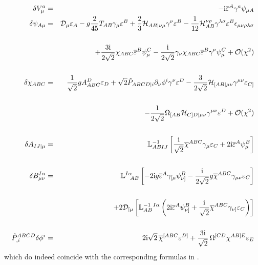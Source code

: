 \documentclass[a4paper,12pt]{article}
\def\bar{\overline}\end {picture}}
\begin{document}
\begin{eqnarray}
\delta V^a_{\mu} &=& - {\rm i} \bar{\varepsilon}^A \gamma^a\psi_{\mu A}  \\
\delta \psi_{A \mu}  &=&{\mathcal{D}}_\mu \varepsilon_A - g
{2\over 45}T_{AB}\gamma_\mu \varepsilon^{B} +  {2\over 3}
\mathcal{H}_{AB|\nu\mu} \gamma^{\nu} \varepsilon^B -{1\over
12}\mathcal{H}_{AB}^{\nu\rho} \gamma^{\lambda\sigma}
\varepsilon^B \epsilon _{\mu\nu\rho\lambda\sigma} \nonumber\\\nonumber\\
&& +{3{\rm i}\over 2\sqrt{2}}
\chi_{ABC}\bar{\varepsilon}^{B}\psi_{\mu}^C - {{\rm i}\over
2\sqrt{2}} \gamma_\nu\chi_{ABC} \bar\varepsilon^B\gamma^\nu
\psi_\mu^C + \mathcal{O} (\chi^2)  \\\nonumber\\
\delta \chi_{ABC} &=& {1\over\sqrt{2}} gA^D_{ABC}\varepsilon_D
+\sqrt{2} \hat{P}_{ABCD|i}\partial_\nu\phi^i
\gamma^\nu\varepsilon^D - {3\over 2\sqrt{2}}
\mathcal{H}_{[AB|\mu\nu}\gamma^{\mu\nu}\varepsilon_{C]} \nonumber\\\nonumber\\
&& - \frac{1}{2\sqrt{2}}
\Omega_{[AB}\mathcal{H}_{C]D|\mu\nu}\gamma^{\mu\nu}\varepsilon^D +
\mathcal{O} (\chi^2) \\\nonumber\\
\delta A_{IJ|\mu} &=& \mathbb{L}^{-1}_{ABIJ}\left[ {{\rm
i}\over\sqrt{2}} \bar{\chi}^{ABC}\gamma_\mu\varepsilon_C
+2{\rm i}\bar\varepsilon^A\psi^B_\mu \right]\\\nonumber\\
\delta B^{I\alpha}_{\mu\nu} &=& \mathbb{L}^{I\alpha}_{~~AB}\left[
- 2{\rm i} g \bar{\varepsilon}^A\gamma_{[\mu}\psi^B_{\nu]}
- {{\rm i}\over 2\sqrt{2}}g\bar{\chi}^{ABC}\gamma_{\mu\nu}\varepsilon_C\right]\nonumber\\\nonumber\\
&&+2\mathcal{D}_{[\mu}\left[ \mathbb{L}^{-1~I\alpha}_{AB}\left(
2{\rm i}\bar\varepsilon^A \psi^B_{\nu]} +{{\rm i}\over\sqrt{2}}
\bar{\chi}^{ABC}\gamma_{\nu]}\varepsilon_C\right)\right]
\label{beq}
 \\\nonumber\\
\hat{P}^{ABCD}_{,i}\delta \phi^i &=& 2{\rm i}\sqrt{2}\,
\bar{\chi}^{[ABC}\varepsilon^{D]}+\frac{3{\rm
i}}{\sqrt{2}}\,\Omega^{[CD}\chi^{AB]E}\varepsilon_E
\end{eqnarray}
which do indeed coincide with the corresponding formulas in
\cite{gunwar}.
\end{document}
